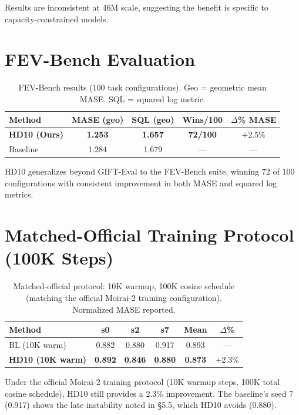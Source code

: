 \documentclass[letterpaper]{article}
\begin{document}
Results are inconsistent at 46M scale, suggesting the benefit is specific to capacity-constrained models.

\section{FEV-Bench Evaluation}
\label{app:fevbench}

\begin{table}[h]
\centering
\caption{FEV-Bench results (100 task configurations). Geo = geometric mean MASE. SQL = squared log metric.}
\label{tab:fevbench}
\small
\begin{tabular}{lcccc}
\toprule
\textbf{Method} & \textbf{MASE (geo)} & \textbf{SQL (geo)} & \textbf{Wins/100} & \textbf{$\Delta$\% MASE} \\
\midrule
\textbf{HD10 (Ours)} & \textbf{1.253} & \textbf{1.657} & \textbf{72/100} & $+2.5\%$ \\
Baseline & 1.284 & 1.679 & --- & --- \\
\bottomrule
\end{tabular}
\end{table}

HD10 generalizes beyond GIFT-Eval to the FEV-Bench suite, winning 72 of 100 configurations with consistent improvement in both MASE and squared log metrics.

\section{Matched-Official Training Protocol (100K Steps)}
\label{app:matched_official}

\begin{table}[h]
\centering
\caption{Matched-official protocol: 10K warmup, 100K cosine schedule (matching the official Moirai-2 training configuration). Normalized MASE reported.}
\label{tab:matched_official}
\small
\begin{tabular}{lccccc}
\toprule
\textbf{Method} & \textbf{s0} & \textbf{s2} & \textbf{s7} & \textbf{Mean} & \textbf{$\Delta$\%} \\
\midrule
BL (10K warm) & 0.882 & 0.880 & 0.917 & 0.893 & --- \\
\textbf{HD10 (10K warm)} & \textbf{0.892} & \textbf{0.846} & \textbf{0.880} & \textbf{0.873} & $+2.3\%$ \\
\bottomrule
\end{tabular}
\end{table}

Under the official Moirai-2 training protocol (10K warmup steps, 100K total cosine schedule), HD10 still provides a 2.3\% improvement. The baseline's seed 7 (0.917) shows the late instability noted in \S5.5, which HD10 avoids (0.880).
\end{document}
